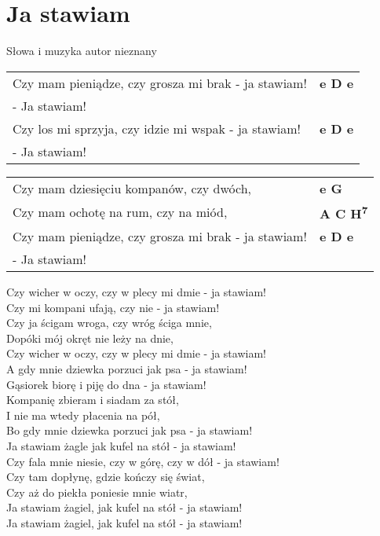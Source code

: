 \section{Ja stawiam}

Słowa i muzyka autor nieznany

\vspace{2em}
\begin{tabular}{@{}p{9cm}@{}l@{}}
Czy mam pieniądze, czy grosza mi brak - ja stawiam! & \bfseries  e D e \\
- Ja stawiam! \\
Czy los mi sprzyja, czy idzie mi wspak - ja stawiam! & \bfseries  e D e \\
- Ja stawiam! \\
\end{tabular}

\vspace{1em}
\begin{tabular}{@{}p{9cm}@{}l@{}}
Czy mam dziesięciu kompanów, czy dwóch, & \bfseries  e G \\
Czy mam ochotę na rum, czy na miód, & \bfseries  A C H\textsuperscript{7} \\
Czy mam pieniądze, czy grosza mi brak - ja stawiam! & \bfseries e D e \\
- Ja stawiam!                                        \\
\end{tabular}

\vspace{1em}
Czy wicher w oczy, czy w plecy mi dmie - ja stawiam! \\
Czy mi kompani ufają, czy nie - ja stawiam! \\
Czy ja ścigam wroga, czy wróg ściga mnie, \\
Dopóki mój okręt nie leży na dnie, \\
Czy wicher w oczy, czy w plecy mi dmie - ja stawiam! \\

A gdy mnie dziewka porzuci jak psa - ja stawiam! \\
Gąsiorek biorę i piję do dna - ja stawiam! \\
Kompanię zbieram i siadam za stół, \\
I nie ma wtedy płacenia na pół, \\
Bo gdy mnie dziewka porzuci jak psa - ja stawiam! \\

Ja stawiam żagle jak kufel na stół - ja stawiam! \\
Czy fala mnie niesie, czy w górę, czy w dół - ja stawiam! \\
Czy tam dopłynę, gdzie kończy się świat, \\
Czy aż do piekła poniesie mnie wiatr, \\
Ja stawiam żagiel, jak kufel na stół - ja stawiam! \\

Ja stawiam żagiel, jak kufel na stół - ja stawiam!